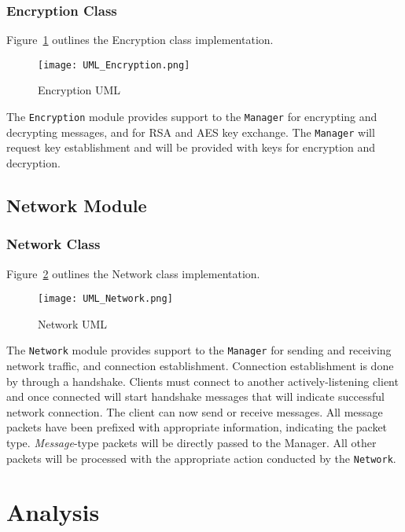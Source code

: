 \documentclass[sigconf]{acmart}
\begin{document}
\subsubsection{Encryption Class}
Figure~\ref{Encryption UML} outlines the Encryption class implementation.
\begin{figure}[htb]
	\begin{center}
		\texttt{[image: UML\_Encryption.png]}
		\caption{Encryption UML}
		\label{Encryption UML}
	\end{center}
\end{figure}
The \texttt{Encryption} module provides support to the \texttt{Manager} for
encrypting and decrypting messages, and for RSA and AES key exchange. The
\texttt{Manager} will request key establishment and will be provided with keys
for encryption and decryption.

\subsection{Network Module}
\subsubsection{Network Class}
Figure~\ref{Network UML} outlines the Network class implementation.
\begin{figure}[htb]
	\begin{center}
		\texttt{[image: UML\_Network.png]}
		\caption{Network UML}
		\label{Network UML}
	\end{center}
\end{figure}
The \texttt{Network} module provides support to the \texttt{Manager} for
sending and receiving network traffic, and connection establishment. Connection
establishment is done by through a handshake. Clients must connect to another
actively-listening client and once connected will start handshake messages that
will indicate successful network connection. The client can now send or receive
messages. All message packets have been prefixed with appropriate information,
indicating the packet type. \textit{Message}-type packets will be directly
passed to the Manager. All other packets will be processed with the appropriate
action conducted by the \texttt{Network}.

\section{Analysis}
\end{document}
